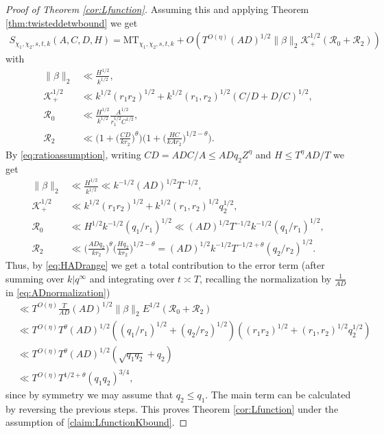 \documentclass[12pt]{amsart}
\theoremstyle{definition}
\theoremstyle{remark}
\numberwithin{equation}{section}
\newcommand{\1}{{\mathbf 1}}
\begin{document}
\begin{proof}[Proof of Theorem \ref{cor:Lfunction}]
Assuming this and applying Theorem \ref{thm:twisteddetwbound} we get
\begin{align*}
    S_{\chi_1,\chi_2,s,t,k}(A,C,D,H) = \mathrm{MT}_{\chi_1,\chi_2,s,t,k} + O(T^{O(\eta)} (AD)^{1/2} \|\beta\|_2 \mathcal{K}_+^{1/2} (\mathcal{R}_0 + \mathcal{R}_2 )  )
\end{align*}
with
\begin{align*}
     \|\beta\|_2 &\ll \frac{H^{1/2}}{k^{1/2}}, \\
     \mathcal{K}_+^{1/2} &\ll k^{1/2} (r_1r_2)^{1/2} + k^{1/2} (r_1,r_2)^{1/2} (C/D+D/C)^{1/2}, \\
     \mathcal{R}_0 &\ll \frac{H^{1/2}}{k^{1/2}}  \frac{A^{1/2}}{r_1^{1/2} C^{1/2}}, \\
     \mathcal{R}_2&\ll \bigg( 1+ \bigg(\frac{CD}{k r_2}\bigg)^{\theta}\bigg) \bigg( 1+ \bigg(\frac{HC}{k A r_2}\bigg)^{1/2-\theta}\bigg).
\end{align*}
By \eqref{eq:ratioassumption}, writing $CD= AD C/A \leq AD q_2 Z^\eta$ and $H \leq T^\eta AD/T$ we get
\begin{align*}
     \|\beta\|_2 &\ll \frac{H^{1/2}}{k^{1/2}} \ll k^{-1/2} (AD)^{1/2} T^{-1/2} , \\
     \mathcal{K}_+^{1/2} &\ll k^{1/2} (r_1r_2)^{1/2} + k^{1/2} (r_1,r_2)^{1/2} q_2^{1/2}, \\
     \mathcal{R}_0 &\ll H^{1/2}k^{-1/2}  (q_1/r_1)^{1/2} \ll (AD)^{1/2}   T^{-1/2} k^{-1/2}  (q_1/r_1)^{1/2} , \\
     \mathcal{R}_2&\ll  \bigg(\frac{AD q_2}{k r_2}\bigg)^{\theta}  \bigg(\frac{H q_2}{k r_2}\bigg)^{1/2-\theta} = (AD)^{1/2} k^{-1/2} T^{-1/2+\theta}  (q_2/r_2)^{1/2}.
\end{align*}
Thus, by \eqref{eq:HADrange} we get a total contribution to the error term (after summing over $k |q^{\infty}$ and integrating over $t \asymp T$, recalling the normalization by $\frac{1}{AD}$ in \eqref{eq:ADnormalization})
\begin{align*}
   & \ll T^{O(\eta)} \frac{T}{AD} (AD)^{1/2}  \|\beta\|_2 E^{1/2} (\mathcal{R}_0 + \mathcal{R}_2 )  \\
   & \ll   T^{O(\eta)}  T^\theta (AD)^{1/2} ((q_1/r_1)^{1/2} + (q_2/r_2)^{1/2})((r_1r_2)^{1/2} + (r_1,r_2)^{1/2} q_2^{1/2}) \\
   & \ll  T^{O(\eta)}   T^\theta  (AD)^{1/2}  ( \sqrt{q_1q_2} + q_2   ) \\
     & \ll  T^{O(\eta)}   T^{1/2+\theta} (q_1q_2)^{3/4},
\end{align*}
since by symmetry we may assume that $q_2 \leq q_1$. The main term can be calculated by reversing the previous steps. This proves Theorem \ref{cor:Lfunction}  under the assumption of \eqref{claim:LfunctionKbound}.





\end{proof}
\end{document}
